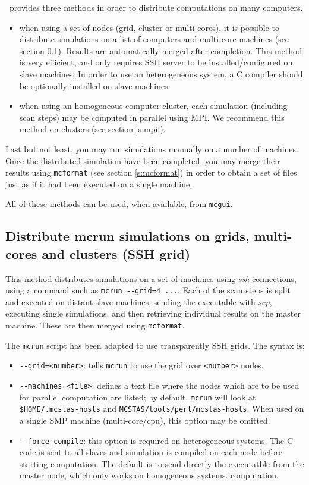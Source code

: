 \MCS\ provides three methods in order to distribute computations on many
computers.
\begin{itemize}
\item when using a set of nodes (grid, cluster or multi-cores), it is possible
  to distribute simulations on a list of computers and multi-core machines (see
  section \ref{s:ssh-grid}). Results are automatically merged after completion.
  This method is very efficient, and only requires SSH server to be
  installed/configured on slave machines.  In order to use an heterogeneous
  system, a C compiler should be optionally installed on slave machines.
\item when using an homogeneous computer cluster, each simulation (including
  scan steps) may be computed in parallel using MPI. We recommend this method on
  clusters (see section \ref{s:mpi}).
\end{itemize}

Last but not least, you may run simulations manually on a number of machines.
Once the distributed simulation have been completed, you may merge their results
using \verb+mcformat+ (see section \ref{s:mcformat})  in
order to obtain a set of files just as if it had been executed on a single
machine.

All of these methods can be used, when available, from \texttt{mcgui}.

\subsection{Distribute mcrun simulations on grids, multi-cores and clusters (SSH
  grid)}
\label{s:ssh-grid}
This method distributes simulations on a set of machines using \emph{ssh}
connections, using a command such as \verb+mcrun --grid=4 ...+.  Each of the
scan steps is split and executed on distant slave machines, sending the
executable with \emph{scp}, executing single simulations, and then retrieving
individual results on the master machine. These are then merged using
\texttt{mcformat}.

The \verb'mcrun' script has been adapted to use transparently SSH grids. The
syntax is:
\begin{itemize}
\item \verb'--grid=<number>': tells \verb'mcrun' to use the grid over \verb'<number>' nodes.
\item \verb'--machines=<file>': defines a text file where the nodes which are to
  be used for parallel computation are listed; by default, \verb'mcrun' will
  look at \verb'$HOME/.mcstas-hosts' and
  \verb'MCSTAS/tools/perl/mcstas-hosts'. When used on a single SMP machine
  (multi-core/cpu), this option may be omitted.
\item \verb'--force-compile': this option is required on heterogeneous systems.
  The C code is sent to all slaves and simulation is compiled on each node
  before starting computation. The default is to send directly the executatble
  from the master node, which only works on homogeneous systems.  computation.
\end{itemize}

